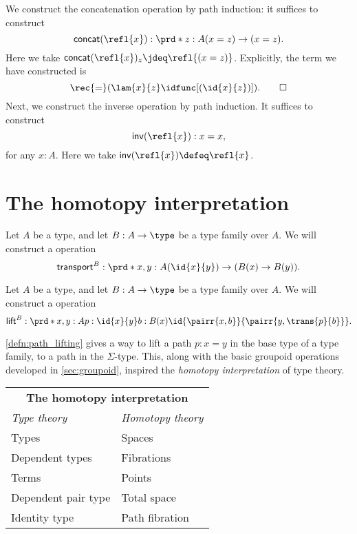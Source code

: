 \begin{constr}
We construct the concatenation operation by path induction: it suffices to construct
\begin{equation*}
\mathsf{concat}(\refl{x}):\prd*{z:A} (x=z)\to(x=z).
\end{equation*}
Here we take $\mathsf{concat}(\refl{x})_z \jdeq \refl{(x=z)}$. 
Explicitly, the term we have constructed is
\begin{equation*}
\rec{=}(\lam{x}{z}\idfunc[(\id{x}{z})]).\qedhere
\end{equation*}
Next, we construct the inverse operation by path induction. It suffices to construct
\begin{equation*}
\mathsf{inv}(\refl{x}): x=x,
\end{equation*}
for any $x:A$. Here we take $\mathsf{inv}(\refl{x})\defeq \refl{x}$.
\end{constr}

\section{The homotopy interpretation}

\begin{defn}
Let $A$ be a type, and let $B:A\to\type$ be a type family over $A$.
We will construct a  operation
\begin{equation*}
\mathsf{transport}^B:\prd*{x,y:A} (\id{x}{y})\to (B(x)\to B(y)).
\end{equation*}
\end{defn}

\begin{defn}\label{defn:path_lifting}
Let $A$ be a type, and let $B:A\to\type$ be a type family over $A$.
We will construct a  operation
\begin{equation*}
\mathsf{lift}^B : \prd*{x,y:A}{p:\id{x}{y}}{b:B(x)} \id{\pairr{x,b}}{\pairr{y,\trans{p}{b}}}.
\end{equation*}
\end{defn}

\autoref{defn:path_lifting} gives a way to lift a path $p:x=y$ in the base type of a type family, to a path in the $\Sigma$-type. This, along with the basic groupoid operations developed in \autoref{sec:groupoid}, inspired the \emph{homotopy interpretation} of type theory.

\begin{center}
\begin{tabular}{ll}
\toprule
\multicolumn{2}{c}{\large\textbf{The homotopy interpretation}}\\[2ex]
\emph{Type theory} &  \emph{Homotopy theory} \\
\midrule
Types  & Spaces \\
Dependent types & Fibrations \\
Terms & Points \\
Dependent pair type & Total space \\
Identity type & Path fibration\\
\bottomrule
\end{tabular}
\end{center}

